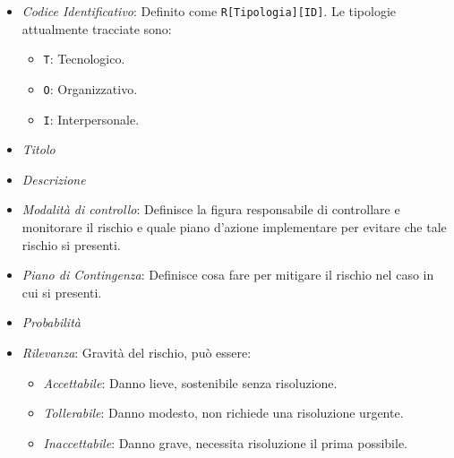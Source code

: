 \begin{itemize}
    \item \textit{Codice Identificativo}: Definito come \texttt{R[Tipologia][ID]}. Le tipologie attualmente tracciate sono:
          \begin{itemize}
              \item \texttt{T}: Tecnologico.
              \item \texttt{O}: Organizzativo.
              \item \texttt{I}: Interpersonale.
          \end{itemize}
    \item \textit{Titolo}
    \item \textit{Descrizione}
    \item \textit{Modalità di controllo}: Definisce la figura responsabile di controllare e monitorare il rischio e quale piano d'azione implementare per evitare che tale rischio si presenti.
    \item \textit{Piano di Contingenza}: Definisce cosa fare per mitigare il rischio nel caso in cui si presenti.
    \item \textit{Probabilità}
    \item \textit{Rilevanza}: Gravità del rischio, può essere:
          \begin{itemize}
              \item \textit{Accettabile}: Danno lieve, sostenibile senza risoluzione.
              \item \textit{Tollerabile}: Danno modesto, non richiede una risoluzione urgente.
              \item \textit{Inaccettabile}: Danno grave, necessita risoluzione il prima possibile.
          \end{itemize}
\end{itemize}